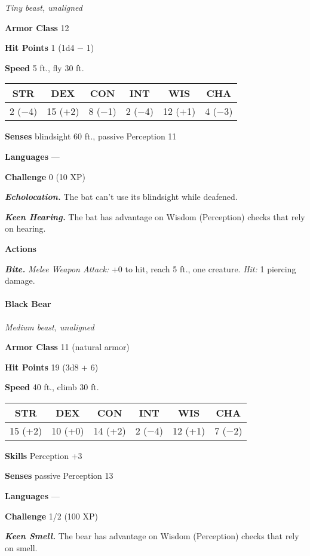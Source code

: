 \documentclass[
]{article}
\begin{document}
\emph{Tiny beast, unaligned}

\textbf{Armor Class} 12

\textbf{Hit Points} 1 (1d4 − 1)

\textbf{Speed} 5 ft., fly 30 ft.

\begin{longtable}[]{@{}cccccc@{}}
\toprule
STR & DEX & CON & INT & WIS & CHA\tabularnewline
\midrule
\endhead
2 (−4) & 15 (+2) & 8 (−1) & 2 (−4) & 12 (+1) & 4 (−3)\tabularnewline
\bottomrule
\end{longtable}

\textbf{Senses} blindsight 60 ft., passive Perception 11

\textbf{Languages} ---

\textbf{Challenge} 0 (10 XP)

\emph{\textbf{Echolocation.}} The bat can't use its blindsight while
deafened.

\emph{\textbf{Keen Hearing.}} The bat has advantage on Wisdom
(Perception) checks that rely on hearing.

\textbf{Actions}

\emph{\textbf{Bite.}} \emph{Melee Weapon Attack:} +0 to hit, reach 5
ft., one creature. \emph{Hit:} 1 piercing damage.

\hypertarget{black-bear}{%
\paragraph{Black Bear}\label{black-bear}}

\emph{Medium beast, unaligned}

\textbf{Armor Class} 11 (natural armor)

\textbf{Hit Points} 19 (3d8 + 6)

\textbf{Speed} 40 ft., climb 30 ft.

\begin{longtable}[]{@{}cccccc@{}}
\toprule
STR & DEX & CON & INT & WIS & CHA\tabularnewline
\midrule
\endhead
15 (+2) & 10 (+0) & 14 (+2) & 2 (−4) & 12 (+1) & 7 (−2)\tabularnewline
\bottomrule
\end{longtable}

\textbf{Skills} Perception +3

\textbf{Senses} passive Perception 13

\textbf{Languages} ---

\textbf{Challenge} 1/2 (100 XP)

\emph{\textbf{Keen Smell.}} The bear has advantage on Wisdom
(Perception) checks that rely on smell.
\end{document}
